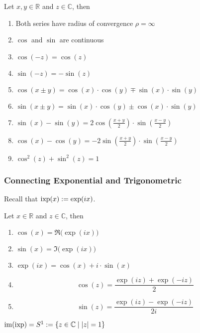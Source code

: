 \begin{proposition}[Properties]
   Let \(x, y \in \mathbb{R}\) and \(z \in \mathbb{C}\), then
   \begin{enumerate}[label=\roman*, align=Center]
      \item Both series have radius of convergence \(\rho = \infty\)
      \item \(\cos\) and \(\sin\) are continuous
      \item \(\cos(-z) = \cos(z)\)
      \item \(\sin(-z) = -\sin(z)\)
      \item \(\cos(x \pm y) = \cos(x) \cdot \cos(y) \mp \sin(x) \cdot \sin(y)\)
      \item \(\sin(x \pm y) = \sin(x) \cdot \cos(y) \pm \cos(x) \cdot \sin(y)\)
      \item \(\sin(x) - \sin(y) = 2 \cos\left(\frac{x+y}{2}\right) \cdot \sin\left(\frac{x-y}{2}\right)\)
      \item \(\cos(x) - \cos(y) = -2 \sin\left(\frac{x+y}{2}\right) \cdot \sin\left(\frac{x-y}{2}\right)\)
      \item \(\cos^2(z) + \sin^2(z) = 1\)
   \end{enumerate}
\end{proposition}

\subsubsection{Connecting Exponential and Trigonometric}
Recall that \(\operatorname{ixp}(x) := \exp(ix)\).

\begin{proposition}
   Let \(x \in \mathbb{R}\) and \(z \in \mathbb{C}\), then
   \begin{enumerate}[label=\roman*, align=Center]
      \item \(\cos(x) = \Re\big(\exp(ix)\big)\)
      \item \(\sin(x) = \Im\big(\exp(ix)\big)\)
      \item \(\exp(ix) = \cos(x) + i \cdot \sin(x)\)
      \item \[\cos(z) = \frac{\exp(iz) + \exp(-iz)}{2}\]
      \item \[\sin(z) = \frac{\exp(iz) - \exp(-iz)}{2i}\]
   \end{enumerate}
\end{proposition}

\begin{theorem}
   \(\operatorname{im}(\operatorname{ixp}) = S^1 := \{z \in \mathbb{C} \mid \lvert z\rvert = 1\}\)
\end{theorem}
\begin{center}
   
\end{center}

